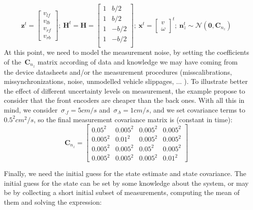 \begin{equation}
 \mathbf{z}^t =
 \left[
 \begin{array}{c}
  v_{lf}\\
  v_{lb}\\
  v_{rf}\\
  v_{rb}
 \end{array}
 \right]; \ 
 \mathbf{H}^t = \mathbf{H} = 
 \left[
 \begin{array}{cc}
  1 & b/2 \\
  1 & b/2 \\
  1 & -b/2 \\
  1 & -b/2 \\
 \end{array}
 \right];\ 
 \mathbf{x}^t=
 \left[
 \begin{array}{c}
  v\\
  \omega
 \end{array}
 \right]^t;\ 
 \mathbf{n}^t_z \sim \mathcal{N}(\mathbf{0},\mathbf{C}_{n_z})
\end{equation}
At this point, we need to model the measurement noise, by setting the coefficients of the~$\mathbf{C}_{n_z}$ matrix according of data and knowledge we may have coming from the device datasheets and/or the measurement procedures (misscalibrations, missynchronizations, noise, unmodelled vehicle slippages, ... ). To illustrate better the effect of different uncertainty levels on measurement, the example propose to consider that the front encoders are cheaper than the back ones. With all this in mind, we consider~$\sigma_{.f}=5cm/s$ and~$\sigma_{.b}=1cm/s$, and we set covariance terms to $0.5^2 cm^2/s$, so the final measurement covariance matrix is (constant in time):
\begin{equation}
 \mathbf{C}_{n_z} = 
 \left[
 \begin{array}{cccc}
  0.05^2 & 0.005^2 & 0.005^2 & 0.005^2 \\
  0.005^2& 0.01^2  & 0.005^2 & 0.005^2 \\
  0.005^2& 0.005^2 & 0.05^2  & 0.005^2 \\
  0.005^2& 0.005^2 & 0.005^2 & 0.01^2
 \end{array}
 \right]
\end{equation}

Finally, we need the initial guess for the state estimate and state covariance. The initial guess for the state can be set by some knowledge about the system, or may be by collecting a short initial subset of measurements, computing the mean of them and solving the expression:

